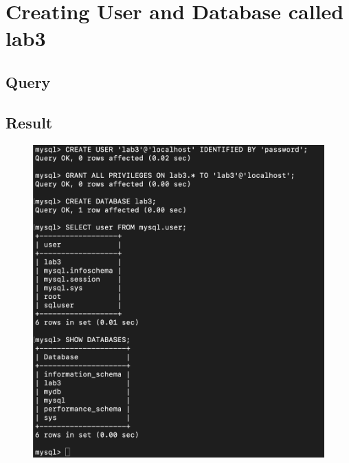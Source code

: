 \documentclass[12pt]{article}
\begin{document}
\begin{titlingpage}
\maketitle
\end{titlingpage}

\newpage

\section{Creating User and Database called lab3}

\subsection{Query}

\subsection{Result}
\begin{figure}[hbt]
    \centering
    \includegraphics[scale=0.55]{screenshots/1.png}
    \label{fig:my_label1}
\end{figure}
\end{document}
